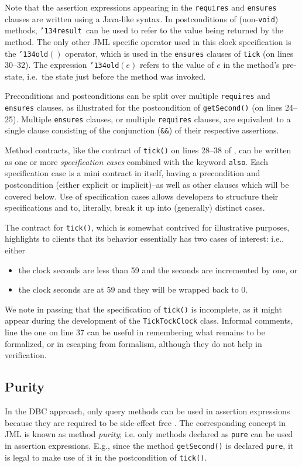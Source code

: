 \documentclass{llncs}
\def\old{\texttt{\char'134old}}
\def\result{\texttt{\char'134result}}
\begin{document}
Note that the assertion expressions appearing in the \texttt{requires} and
\texttt{ensures} clauses are written using a Java-like syntax.
%
\GMARGIN{\old}
\GMARGIN{\result}
%
In postconditions of (non-\texttt{void}) methods, \result\ can be used to refer to the 
value being returned by the method.
The only other JML specific operator used in this clock specification is the
\old$()$ operator, which is used in the \texttt{ensures} clauses of
\texttt{tick} (on lines 30--32).  The 
expression \old$(e)$ refers to the value of $e$ in the method's pre-state,
i.e.\ the state just before the method was invoked.

Preconditions and postconditions can be split over multiple \texttt{requires}
and \texttt{ensures} clauses, as illustrated for the postcondition of 
\texttt{getSecond()} (on lines 24--25).  Multiple \texttt{ensures}
clauses, or multiple \texttt{requires} clauses, are equivalent to
a single clause consisting of the conjunction (\texttt{\&\&}) of their
respective assertions.

Method contracts, like the contract of \texttt{tick()} on lines 28--38
of , can be written as one or
more \emph{specification cases} combined with the keyword \texttt{also}.
Each specification case is a mini contract in itself, having a precondition
and postcondition (either explicit or implicit)--as well as other clauses
which will be covered below.
Use of specification cases allows developers to structure their
specifications and to, literally, break it up into (generally) distinct cases.

The contract for \texttt{tick()},
which is somewhat contrived for illustrative purposes,
highlights to clients that its behavior 
essentially has two cases of interest: i.e., either 
\begin{itemize}
  \item the clock seconds are less than 59 and the seconds are incremented by one,
    or
  \item the clock seconds are at 59 and they will be wrapped back to 0.
\end{itemize}
%
We note in passing that the specification of \texttt{tick()} is incomplete, as
it might appear during the development of the \texttt{TickTockClock} class.
Informal comments, line the one on line 37 can be useful in
remembering what remains to be formalized, or in escaping from
formalism, although they do not help in verification. 

\subsection{Purity}
%
In the DBC approach, only query methods can be used in assertion expressions
because they are required to be side-effect free \cite{Meyer97}.
% 
The corresponding concept in JML is known as method \emph{purity}; i.e. only methods
declared as \texttt{pure} can be used in assertion expressions. 
E.g., since the method \texttt{getSecond()} is declared \texttt{pure}, it is
legal to make use of it in the postcondition of \texttt{tick()}.
\end{document}
